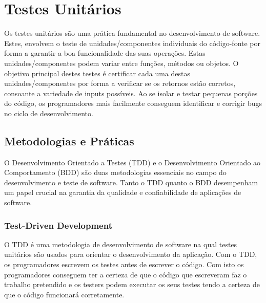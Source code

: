 \documentclass[a4paper,12pt]{article} %
\begin{document}
\newpage
\section{Testes Unitários}
Os testes unitários são uma prática fundamental no desenvolvimento de software. Estes, envolvem o teste de unidades/componentes individuais do código-fonte por forma a garantir a boa funcionalidade das suas operações. Estas unidades/componentes podem variar entre funções, métodos ou objetos. O objetivo principal destes testes é certificar cada uma destas unidades/componentes por forma a verificar se os retornos estão corretos, consoante a variedade de inputs possíveis. Ao se isolar e testar pequenas porções do código, os programadores mais facilmente conseguem identificar e corrigir bugs no ciclo de desenvolvimento.

\subsection{Metodologias e Práticas}
O Desenvolvimento Orientado a Testes (TDD) e o Desenvolvimento Orientado ao Comportamento (BDD) são duas metodologias essenciais no campo do desenvolvimento e teste de software. Tanto o TDD quanto o BDD desempenham um papel crucial na garantia da qualidade e confiabilidade de aplicações de software.

\subsubsection{Test-Driven Development}
O TDD é uma metodologia de desenvolvimento de software na qual testes unitários são usados para orientar o desenvolvimento da aplicação. Com o TDD, os programadores escrevem os testes antes de escrever o código. Com isto os programadores conseguem ter a certeza de que o código que escreveram faz o trabalho pretendido e os testers podem executar os seus testes tendo a certeza de que o código funcionará corretamente.
\end{document}
